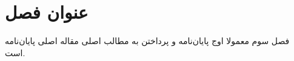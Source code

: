 \chapter{عنوان فصل}\label{S3}
\pagestyle{plain}


فصل سوم معمولا اوج پایان‌نامه و پرداختن به مطالب اصلی مقاله اصلی پایان‌نامه است. 

